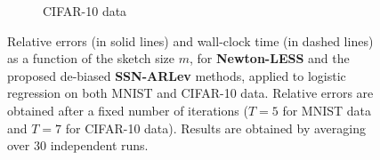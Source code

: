\documentclass[11pt,a4paper]{article}
\begin{document}
\begin{figure}[thb]
\begin{subfigure}[c]{0.48\textwidth}
\captionsetup{font=scriptsize}
 \caption{CIFAR-10 data}
  \end{subfigure}
%
\caption{{ Relative errors (in solid lines) and wall-clock time (in dashed lines) as a function of the sketch size $m$, for \textbf{\GREEN Newton-LESS} and the proposed de-biased \textbf{\RED SSN-ARLev} methods, applied to logistic regression on both MNIST and CIFAR-10 data. 
Relative errors are obtained after a fixed number of iterations ($T=5$ for MNIST data and $T=7$ for CIFAR-10 data).
Results are obtained by averaging over $30$ independent runs. 
}}
\label{fig:sketch size}
\end{figure}
%
%
%
\end{document}
